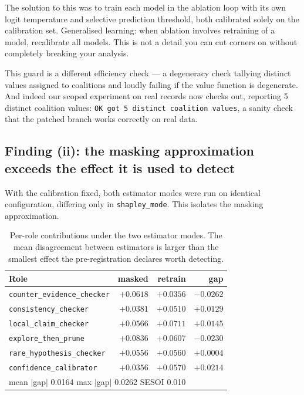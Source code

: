 The solution to this was to train each model in the ablation loop with its own logit temperature and
selective prediction threshold, both calibrated solely on the calibration set. Generalised learning:
when ablation involves retraining of a model, recalibrate all models. This is not a detail you can
cut corners on without completely breaking your analysis.

This guard is a different efficiency check --- a degeneracy check tallying distinct values assigned
to coalitions and loudly failing if the value function is degenerate. And indeed our scoped
experiment on real records now checks out, reporting 5 distinct coalition values:
\texttt{OK got 5 distinct coalition values}, a sanity check that the patched branch works correctly
on real data.

\subsection{Finding (ii): the masking approximation exceeds the effect it is used to detect}

With the calibration fixed, both estimator modes were run on identical configuration, differing only
in \texttt{shapley\_mode}. This isolates the masking approximation.

\begin{table}[h]
\centering
\small
\begin{tabular}{lrrr}
\toprule
Role & masked & retrain & gap \\
\midrule
\texttt{counter\_evidence\_checker} & $+0.0618$ & $+0.0356$ & $-0.0262$ \\
\texttt{consistency\_checker}       & $+0.0381$ & $+0.0510$ & $+0.0129$ \\
\texttt{local\_claim\_checker}      & $+0.0566$ & $+0.0711$ & $+0.0145$ \\
\texttt{explore\_then\_prune}       & $+0.0836$ & $+0.0607$ & $-0.0230$ \\
\texttt{rare\_hypothesis\_checker}  & $+0.0556$ & $+0.0560$ & $+0.0004$ \\
\texttt{confidence\_calibrator}     & $+0.0356$ & $+0.0570$ & $+0.0214$ \\
\midrule
\multicolumn{4}{l}{mean $|$gap$|$ 0.0164 \quad max $|$gap$|$ 0.0262 \quad SESOI 0.010} \\
\bottomrule
\end{tabular}
\caption{Per-role contributions under the two estimator modes. The mean disagreement between
estimators is larger than the smallest effect the pre-registration declares worth detecting.}
\label{tab:estimator-gap}
\end{table}

